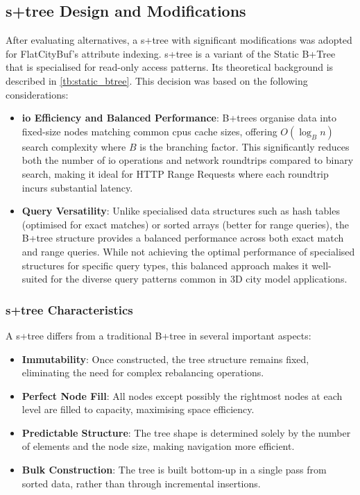 \subsection{\texorpdfstring{\ac{s+tree}}{S+tree} Design and Modifications}
\label{methodology:attribute_index:static_btree_design}

After evaluating alternatives, a \ac{s+tree} with significant modifications was adopted for FlatCityBuf's attribute indexing. \ac{s+tree} is a variant of the Static B+Tree that is specialised for read-only access patterns. Its theoretical background is described in \autoref{tb:static_btree}. This decision was based on the following considerations:

\begin{itemize}
  \item \textbf{\ac{io} Efficiency and Balanced Performance}: B+trees organise data into fixed-size nodes matching common \acp{cpu} cache sizes, offering $O(\log_B n)$ search complexity where $B$ is the branching factor. This significantly reduces both the number of \ac{io} operations and network roundtrips compared to binary search, making it ideal for HTTP Range Requests where each roundtrip incurs substantial latency.

  \item \textbf{Query Versatility}: Unlike specialised data structures such as hash tables (optimised for exact matches) or sorted arrays (better for range queries), the B+tree structure provides a balanced performance across both exact match and range queries. While not achieving the optimal performance of specialised structures for specific query types, this balanced approach makes it well-suited for the diverse query patterns common in 3D city model applications.
\end{itemize}

\subsubsection{\ac{s+tree} Characteristics}
\label{methodology:attribute_index:static_btree_characteristics}

A \ac{s+tree} differs from a traditional B+tree in several important aspects:

\begin{itemize}
  \item \textbf{Immutability}: Once constructed, the tree structure remains fixed, eliminating the need for complex rebalancing operations.

  \item \textbf{Perfect Node Fill}: All nodes except possibly the rightmost nodes at each level are filled to capacity, maximising space efficiency.

  \item \textbf{Predictable Structure}: The tree shape is determined solely by the number of elements and the node size, making navigation more efficient.

  \item \textbf{Bulk Construction}: The tree is built bottom-up in a single pass from sorted data, rather than through incremental insertions.
\end{itemize}

